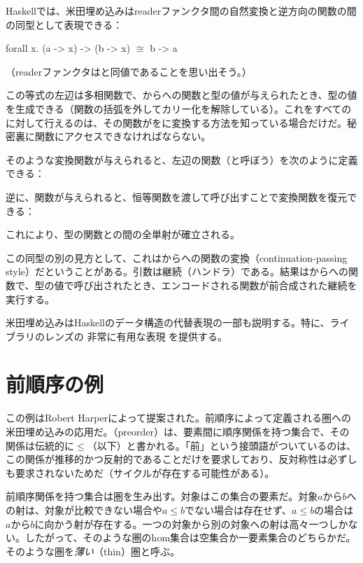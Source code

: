 Haskellでは、米田埋め込みはreaderファンクタ間の自然変換と逆方向の関数の間の同型として表現できる：

\begin{snipv}
forall x. (a -> x) -> (b -> x) \ensuremath{\cong} b -> a
\end{snipv}
（readerファンクタはと同値であることを思い出そう。）

この等式の左辺は多相関数で、からへの関数と型の値が与えられたとき、型の値を生成できる（関数の括弧を外してカリー化を解除している）。これをすべてのに対して行えるのは、その関数がをに変換する方法を知っている場合だけだ。秘密裏に関数にアクセスできなければならない。

そのような変換関数が与えられると、左辺の関数（と呼ぼう）を次のように定義できる：

逆に、関数が与えられると、恒等関数を渡して呼び出すことで変換関数を復元できる：

これにより、型の関数との間の全単射が確立される。

この同型の別の見方として、これはからへの関数の変換（continuation-passing style）だということがある。引数は継続（ハンドラ）である。結果はからへの関数で、型の値で呼び出されたとき、エンコードされる関数が前合成された継続を実行する。

米田埋め込みはHaskellのデータ構造の代替表現の一部も説明する。特に、ライブラリのレンズの
{非常に有用な表現}
を提供する。

\section{前順序の例}

この例はRobert Harperによって提案された。前順序によって定義される圏への米田埋め込みの応用だ。（preorder）は、要素間に順序関係を持つ集合で、その関係は伝統的に$\leqslant$（以下）と書かれる。「前」という接頭語がついているのは、この関係が推移的かつ反射的であることだけを要求しており、反対称性は必ずしも要求されないためだ（サイクルが存在する可能性がある）。

前順序関係を持つ集合は圏を生み出す。対象はこの集合の要素だ。対象$a$から$b$への射は、対象が比較できない場合や$a \leqslant b$でない場合は存在せず、$a \leqslant b$の場合は$a$から$b$に向かう射が存在する。一つの対象から別の対象への射は高々一つしかない。したがって、そのような圏のhom集合は空集合か一要素集合のどちらかだ。そのような圏を\emph{薄い}（thin）圏と呼ぶ。

